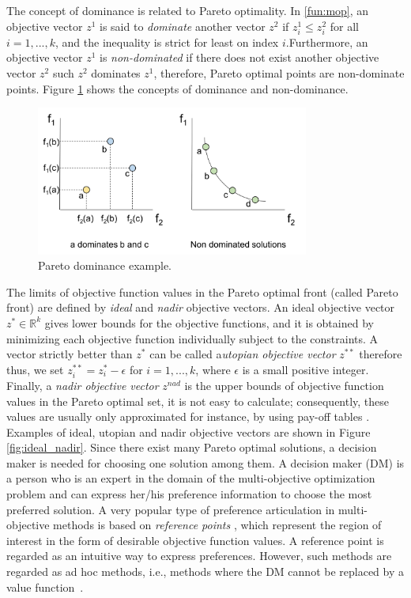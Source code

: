 The concept of dominance is related to Pareto optimality. In \ref{fun:mop}, an objective vector $z^{1}$ is said to \textit{dominate} another vector $z^{2}$ if $z_{i}^{1} \leq z_{i}^{2} $ for all $i= 1,...,k$, and the inequality is strict for least on index $i$.Furthermore, an objective vector $z^{1}$ is \textit{non-dominated} if there does not exist another objective vector $z^{2}$ such $z^{2}$  dominates $z^{1}$, therefore, Pareto optimal points are non-dominate points. Figure \ref{fig:dominance} shows the concepts of dominance and non-dominance.
\begin{figure}[H] %
	\centering 
	\includegraphics[width=0.80\textwidth]{figures/metaheuristics/my-dominance.png}
	\caption{Pareto dominance example.} \label{fig:dominance}
\end{figure} 

The limits of objective function values in the Pareto optimal front (called Pareto front) are defined by \textit{ideal} and \textit{nadir} objective vectors. An ideal objective vector $z^{*} \in \mathbb{R}^{k}$ gives lower bounds for the objective functions, and it is obtained by minimizing each objective function individually subject to the constraints. A vector strictly better than $z^{*}$ can be called a\textit{utopian objective vector} $z^{**}$ therefore thus, we set $z_{i}^{**} = z_{i}^{*}- \epsilon$ for $i = 1,...,k$, where $\epsilon$ is a small positive integer. Finally, a \textit{nadir objective vector} $z^{nad}$ is the upper bounds of objective function values in the Pareto optimal set, it is not easy to calculate; consequently, these values are usually only approximated for instance, by using pay-off tables \cite{deb2010nadir,miettinen1999nonlinear}. Examples of ideal, utopian and nadir objective vectors are shown in Figure \ref{fig:ideal_nadir}. Since there exist many Pareto optimal solutions, a decision maker is needed for choosing one solution among them. A decision maker (DM) is a person who is an expert in the domain of the multi-objective optimization problem and can express her/his preference information to choose the most preferred solution.
A very popular type of preference articulation in multi-objective methods is based on \textit{reference points} \cite{branke2008multiobjective,kaisa2016}, which represent the region of interest in the form of desirable objective function values. A reference point is regarded as an intuitive way to express preferences. However, such methods are regarded as ad hoc methods, i.e., methods where the DM cannot be replaced by a value function~\cite{miettinen1999nonlinear,Stewart2005}. 

